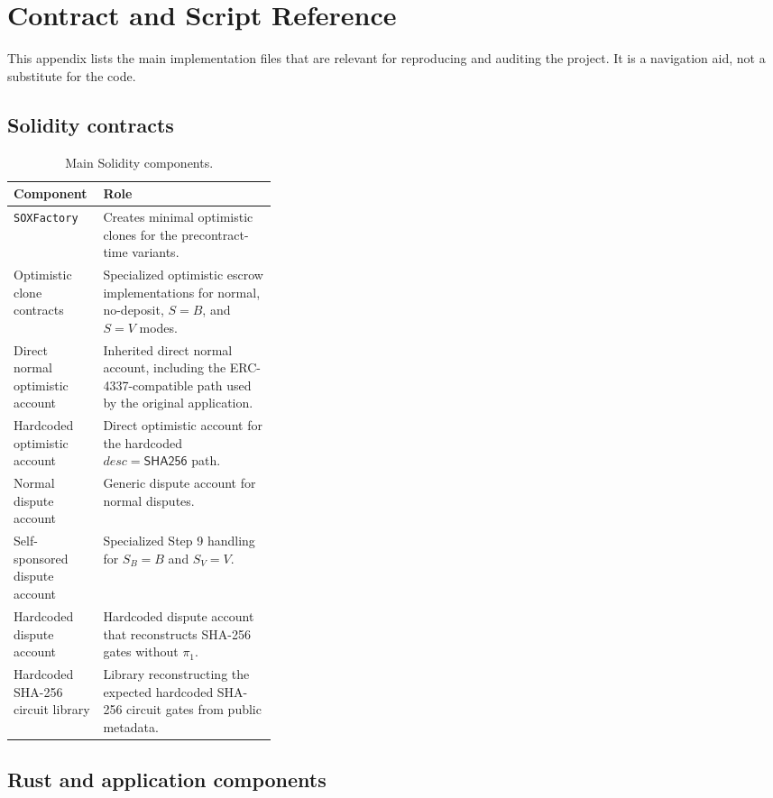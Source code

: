 \chapter{Contract and Script Reference}
\label{app:contract-script-reference}

This appendix lists the main implementation files that are relevant for reproducing and
auditing the project. It is a navigation aid, not a substitute for the code.

\section{Solidity contracts}

\begin{table}[H]
  \centering
  \small
  \begin{tabularx}{\linewidth}{>{\raggedright\arraybackslash}p{0.34\linewidth}>{\raggedright\arraybackslash}X}
    \toprule
    Component & Role \\
    \midrule
    \texttt{SOXFactory} & Creates minimal optimistic clones for the precontract-time
    variants. \\
    Optimistic clone contracts & Specialized optimistic escrow implementations for
    normal, no-deposit, \(S=B\), and \(S=V\) modes. \\
    Direct normal optimistic account & Inherited direct normal account, including the
    ERC-4337-compatible path used by the original application. \\
    Hardcoded optimistic account & Direct optimistic account for the
    hardcoded \(desc=\mathsf{SHA256}\) path. \\
    Normal dispute account & Generic dispute account for normal disputes. \\
    Self-sponsored dispute account & Specialized Step 9 handling for
    \(S_B=B\) and \(S_V=V\). \\
    Hardcoded dispute account & Hardcoded dispute account that
    reconstructs SHA-256 gates without \(\pi_1\). \\
    Hardcoded SHA-256 circuit library & Library reconstructing the expected hardcoded
    SHA-256 circuit gates from public metadata. \\
    \bottomrule
  \end{tabularx}
  \caption{Main Solidity components.}
  \label{tab:app-solidity-reference}
\end{table}

\section{Rust and application components}

